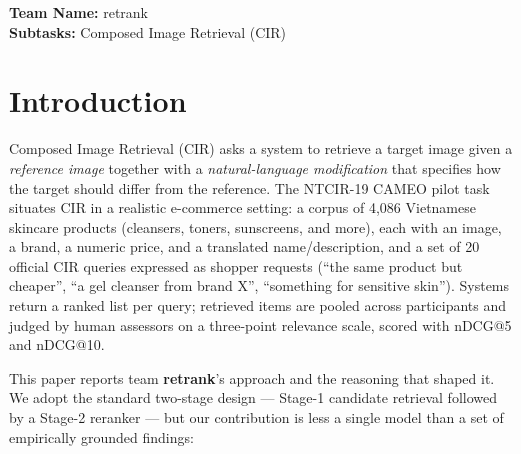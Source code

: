 \documentclass[sigconf,nonacm]{acmart}
\begin{document}

\maketitle

\noindent\textbf{Team Name:} retrank\\
\textbf{Subtasks:} Composed Image Retrieval (CIR)
\medskip

\section{Introduction}
Composed Image Retrieval (CIR) asks a system to retrieve a target image
given a \emph{reference image} together with a \emph{natural-language
modification} that specifies how the target should differ from the
reference. The NTCIR-19 CAMEO pilot task~\cite{cameo} situates CIR in a realistic
e-commerce setting: a corpus of 4{,}086 Vietnamese skincare products
(cleansers, toners, sunscreens, and more), each with an image, a brand, a
numeric price, and a translated
name/description, and a set of 20 official CIR queries expressed as shopper
requests (``the same product but cheaper'', ``a gel cleanser from brand
X'', ``something for sensitive skin''). Systems return a ranked list per
query; retrieved items are pooled across participants and judged by human
assessors on a three-point relevance scale, scored with nDCG@5 and nDCG@10.

This paper reports team \textbf{retrank}'s approach and the reasoning that
shaped it. We adopt the standard two-stage design --- Stage-1 candidate
retrieval followed by a Stage-2 reranker --- but our contribution is less a
single model than a set of empirically grounded findings:
\end{document}
